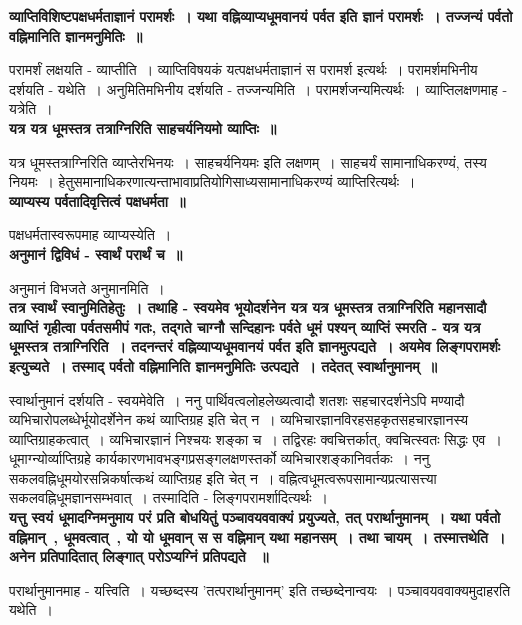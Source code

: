 	{\bfseries व्याप्तिविशिष्टपक्षधर्मताज्ञानं परामर्शः~। यथा वह्निव्याप्यधूमवानयं पर्वत इति ज्ञानं परामर्शः~। तज्जन्यं पर्वतो वह्निमानिति ज्ञानमनुमितिः~॥}\par
		परामर्शं लक्षयति - व्याप्तीति~। व्याप्तिविषयकं यत्पक्षधर्मताज्ञानं स परामर्श इत्यर्थः~। परामर्शमभिनीय दर्शयति - यथेति~। अनुमितिमभिनीय दर्शयति - तज्जन्यमिति~। परामर्शजन्यमित्यर्थः~। व्याप्तिलक्षणमाह - यत्रेति~।\\[10pt]
	{\bfseries यत्र यत्र धूमस्तत्र तत्राग्निरिति साहचर्यनियमो व्याप्तिः~॥}\par
		यत्र धूमस्तत्राग्निरिति व्याप्तेरभिनयः~। साहचर्यनियमः इति लक्षणम्~। साहचर्यं सामानाधिकरण्यं, तस्य नियमः~। हेतुसमानाधिकरणात्यन्ताभावाप्रतियोगिसाध्यसामानाधिकरण्यं व्याप्तिरित्यर्थः~।\\[10pt]
	\noindent
	{\bfseries व्याप्यस्य पर्वतादिवृत्तित्वं पक्षधर्मता~॥}\par
		पक्षधर्मतास्वरूपमाह व्याप्यस्येति~।\\[10pt]
	{\bfseries अनुमानं द्विविधं - स्वार्थं परार्थं च~॥}\par
		अनुमानं विभजते अनुमानमिति~।\\[10pt]
	{\bfseries तत्र स्वार्थं स्वानुमितिहेतुः~। तथाहि - स्वयमेव भूयोदर्शनेन यत्र यत्र धूमस्तत्र तत्राग्निरिति महानसादौ व्याप्तिं गृहीत्वा पर्वतसमीपं गतः, तद्गते चाग्नौ सन्दिहानः पर्वते धूमं पश्यन् व्याप्तिं स्मरति - यत्र यत्र धूमस्तत्र तत्राग्निरिति~। तदनन्तरं वह्निव्याप्यधूमवानयं पर्वत इति ज्ञानमुत्पद्यते~। अयमेव लिङ्गपरामर्शः इत्युच्यते~। तस्माद् पर्वतो वह्निमानिति ज्ञानमनुमितिः उत्पद्यते~। तदेतत् स्वार्थानुमानम्~॥}\par
		स्वार्थानुमानं दर्शयति - स्वयमेवेति~। ननु पार्थिवत्वलोहलेख्यत्वादौ शतशः सहचारदर्शनेऽपि मण्यादौ व्यभिचारोपलब्धेर्भूयोदर्शेनेन कथं व्याप्तिग्रह इति चेत् न~। व्यभिचारज्ञानविरहसहकृतसहचारज्ञानस्य व्याप्तिग्राहकत्वात्~। व्यभिचारज्ञानं निश्चयः शङ्का च~। तद्विरहः क्वचित्तर्कात्, क्वचित्स्वतः सिद्धः एव~। धूमाग्न्योर्व्याप्तिग्रहे कार्यकारणभावभङ्गप्रसङ्गलक्षणस्तर्को व्यभिचारशङ्कानिवर्तकः~। ननु सकलवह्निधूमयोरसन्निकर्षात्कथं व्याप्तिग्रह इति चेत् न~। वह्नित्वधूमत्वरूपसामान्यप्रत्यासत्त्या सकलवह्निधूमज्ञानसम्भवात्~। तस्मादिति - लिङ्गपरामर्शादित्यर्थः~।\\[10pt]
	{\bfseries यत्तु स्वयं धूमादग्निमनुमाय परं प्रति बोधयितुं पञ्चावयववाक्यं प्रयुज्यते, तत् परार्थानुमानम्~। यथा पर्वतो वह्निमान्~, धूमवत्वात्~, यो यो धूमवान् स स वह्निमान् यथा महानसम्~। तथा चायम्~। तस्मात्तथेति~। अनेन प्रतिपादितात् लिङ्गात् परोऽप्यग्निं प्रतिपद्यते ~॥}\par
		परार्थानुमानमाह - यत्त्विति~। यच्छब्दस्य ’तत्परार्थानुमानम्’ इति तच्छब्देनान्वयः~। पञ्चावयववाक्यमुदाहरति यथेति~।\\[10pt]
